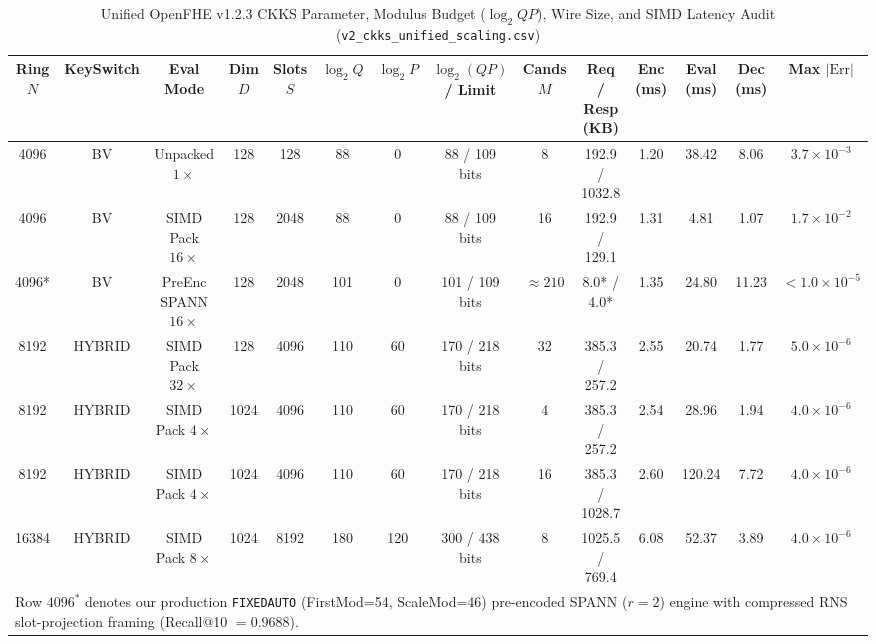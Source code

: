 \documentclass[10pt,journal,compsoc]{IEEEtran}
\begin{document}
\begin{table}[!t]
\centering
\caption{Unified OpenFHE v1.2.3 CKKS Parameter, Modulus Budget ($\log_2 QP$), Wire Size, and SIMD Latency Audit (\texttt{v2\_ckks\_unified\_scaling.csv})}
\label{tab:ckks}
\setlength{\tabcolsep}{4.2pt}
\begin{tabular}{@{}cccccccccccccc@{}}
\toprule
Ring $N$ & KeySwitch & Eval Mode & Dim $D$ & Slots $S$ & $\log_2 Q$ & $\log_2 P$ & $\log_2(QP)$ / Limit & Cands $M$ & Req / Resp (KB) & Enc (ms) & Eval (ms) & Dec (ms) & Max $|\text{Err}|$ \\
\midrule
4096  & BV     & Unpacked $1\times$  & 128  & 128  & 88  & 0   & 88 / 109 bits  & 8  & 192.9 / 1032.8 & 1.20 & 38.42 & 8.06  & $3.7 \times 10^{-3}$ \\
4096  & BV     & SIMD Pack $16\times$& 128  & 2048 & 88  & 0   & 88 / 109 bits  & 16 & 192.9 / 129.1  & 1.31 & 4.81  & 1.07  & $1.7 \times 10^{-2}$ \\
4096* & BV     & PreEnc SPANN $16\times$& 128 & 2048 & 101 & 0   & 101 / 109 bits & $\approx 210$ & 8.0* / 4.0* & 1.35 & 24.80 & 11.23 & $< 1.0 \times 10^{-5}$ \\
8192  & HYBRID & SIMD Pack $32\times$& 128  & 4096 & 110 & 60  & 170 / 218 bits & 32 & 385.3 / 257.2  & 2.55 & 20.74 & 1.77  & $5.0 \times 10^{-6}$ \\
8192  & HYBRID & SIMD Pack $4\times$ & 1024 & 4096 & 110 & 60  & 170 / 218 bits & 4  & 385.3 / 257.2  & 2.54 & 28.96 & 1.94  & $4.0 \times 10^{-6}$ \\
8192  & HYBRID & SIMD Pack $4\times$ & 1024 & 4096 & 110 & 60  & 170 / 218 bits & 16 & 385.3 / 1028.7 & 2.60 & 120.24& 7.72  & $4.0 \times 10^{-6}$ \\
16384 & HYBRID & SIMD Pack $8\times$ & 1024 & 8192 & 180 & 120 & 300 / 438 bits & 8  & 1025.5 / 769.4 & 6.08 & 52.37 & 3.89  & $4.0 \times 10^{-6}$ \\
\bottomrule
\multicolumn{14}{l}{\scriptsize *Row $4096^*$ denotes our production \texttt{FIXEDAUTO} (FirstMod=54, ScaleMod=46) pre-encoded SPANN ($r=2$) engine with compressed RNS slot-projection framing (Recall@10 $=0.9688$).}
\end{tabular}
\end{table}
\end{document}
